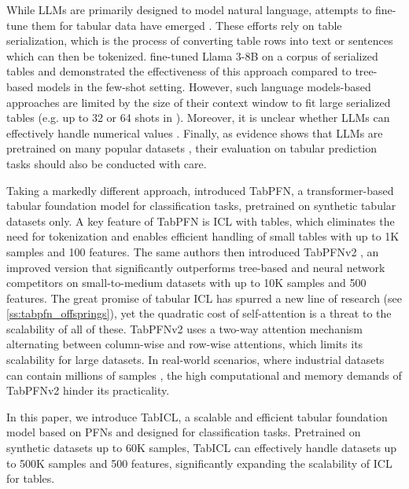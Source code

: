 \documentclass{article}
\theoremstyle{plain}
\theoremstyle{definition}
\theoremstyle{remark}
\begin{document}
While LLMs are primarily designed to model natural language, attempts to fine-tune them for tabular data have emerged \citep[and references therein]{hegselmann2023tabllm, fang2024largelanguagemodelsllmstabular}. These efforts rely on table serialization, which is the process of converting table rows into text or sentences which can then be tokenized. \citet{gardnerLargeScaleTransfer2024} fine-tuned Llama 3-8B on a corpus of serialized tables and demonstrated the effectiveness of this approach compared to tree-based models in the few-shot setting. However, such language models-based approaches are limited by the size of their context window to fit large serialized tables (e.g. up to 32 or 64 shots in \citealt{gardnerLargeScaleTransfer2024}). Moreover, it is unclear whether LLMs can effectively handle numerical values \citep{thawaniRepresentingNumbersNLP2021}. Finally, as evidence shows that LLMs are pretrained on many popular datasets \cite{bordt2024elephants}, their evaluation on tabular prediction tasks should also be conducted with care.

Taking a markedly different approach,  \citet{hollmannTabpfnTransformerThat2022} introduced TabPFN, a transformer-based tabular foundation model for classification tasks, pretrained on synthetic tabular datasets only. A key feature of TabPFN is ICL with tables, which eliminates the need for tokenization and enables efficient handling of small tables with up to 1K samples and 100 features. The same authors then introduced TabPFNv2 \citep{hollmannAccuratePredictionsSmall2025}, an improved version that significantly outperforms tree-based and neural network competitors on small-to-medium datasets with up to 10K samples and 500 features. The great promise of tabular ICL has spurred a new line of research (see \cref{ss:tabpfn_offsprings}), yet the quadratic cost of self-attention is a threat to the scalability of all of these. TabPFNv2 uses a two-way attention mechanism alternating between column-wise and row-wise attentions, which limits its scalability for large datasets. In real-world scenarios, where industrial datasets can contain millions of samples \citep{rubachev2024tabred}, the high computational and memory demands of TabPFNv2 hinder its practicality.

In this paper, we introduce TabICL, a scalable and efficient tabular foundation model based on PFNs \citep{mullerTransformersCanBayesian2024} and designed for classification tasks. Pretrained on synthetic datasets up to 60K samples, TabICL can effectively handle datasets up to 500K samples and 500 features, significantly expanding the scalability of ICL for tables.
\end{document}
